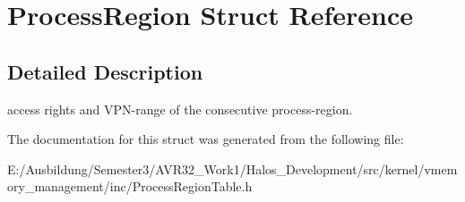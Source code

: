 \hypertarget{struct_process_region}{
\section{ProcessRegion Struct Reference}
\label{struct_process_region}
}


\subsection{Detailed Description}
access rights and VPN-range of the consecutive process-region. 

The documentation for this struct was generated from the following file:\begin{CompactItemize}
\item 
E:/Ausbildung/Semester3/AVR32\_\-Work1/Halos\_\-Development/src/kernel/vmemory\_\-management/inc/ProcessRegionTable.h\end{CompactItemize}
